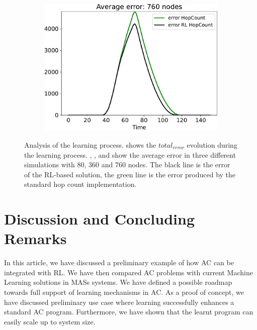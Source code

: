 \documentclass[conference]{IEEEtran}
\newcommand{\todos}[1]{\todo[inline, color=cyan]{\textbf{TODO}: #1}}
\begin{document}
\begin{figure}
\begin{subfigure}[b]{0.3\textwidth}
      \includegraphics[width=\textwidth]{img/760}
      \caption{}
      \label{fig:simulation-d}
  \end{subfigure}
  \caption{Analysis of the learning process.  shows the $total_{error}$ evolution during the learning process. , , and  show the average error in three different simulations with 80, 360 and 760 nodes. 
  The black line is the error of the RL-based solution, 
  the green line is the error produced by the standard hop count implementation.}
  \label{fig:simulation}
\end{figure}

\section{Discussion and Concluding Remarks}\label{conclusion}
In this article, we have discussed a preliminary example of how AC can be integrated with RL. 
We have then compared AC problems with current Machine Learning solutions in MASs systems.
%
We have defined a possible roadmap towards full support of learning mechanisms in AC. %
As a proof of concept, we have discussed preliminary use case where 
 learning successfully enhances a standard AC program.
Furthermore, we have shown that the learnt program can easily scale up to system size.
\end{document}
